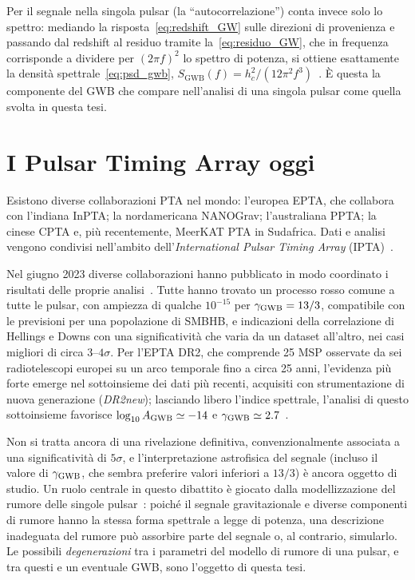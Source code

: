 Per il segnale nella singola pulsar (la ``autocorrelazione'') conta invece solo lo spettro: mediando la risposta~\eqref{eq:redshift_GW} sulle direzioni di provenienza e passando dal redshift al residuo tramite la~\eqref{eq:residuo_GW}, che in frequenza corrisponde a dividere per $(2\pi f)^2$ lo spettro di potenza, si ottiene esattamente la densità spettrale~\eqref{eq:psd_gwb}, $S_{\mathrm{GWB}}(f) = h_c^2/(12\pi^2 f^3)$~\cite{Taylor2021}. È questa la componente del GWB che compare nell'analisi di una singola pulsar come quella svolta in questa tesi.

\section{I Pulsar Timing Array oggi} \label{sec:PTA_oggi}

Esistono diverse collaborazioni PTA nel mondo: l'europea EPTA, che collabora con l'indiana InPTA; la nordamericana NANOGrav; l'australiana PPTA; la cinese CPTA e, più recentemente, MeerKAT PTA in Sudafrica. Dati e analisi vengono condivisi nell'ambito dell'\textit{International Pulsar Timing Array} (IPTA)~\cite{Shaifullah2025}.

Nel giugno 2023 diverse collaborazioni hanno pubblicato in modo coordinato i risultati delle proprie analisi~\cite{EPTA2023_GWB, NANOGrav2023, PPTA2023, CPTA2023}. Tutte hanno trovato un processo rosso comune a tutte le pulsar, con ampiezza di qualche $10^{-15}$ per $\gamma_{\mathrm{GWB}} = 13/3$, compatibile con le previsioni per una popolazione di SMBHB, e indicazioni della correlazione di Hellings e Downs con una significatività che varia da un dataset all'altro, nei casi migliori di circa $3$--$4\sigma$. %
Per l'EPTA DR2, che comprende 25 MSP osservate da sei radiotelescopi europei su un arco temporale fino a circa 25 anni, l'evidenza più forte emerge nel sottoinsieme dei dati più recenti, acquisiti con strumentazione di nuova generazione (\textit{DR2new}); lasciando libero l'indice spettrale, l'analisi di questo sottoinsieme favorisce $\log_{10}A_{\mathrm{GWB}} \simeq -14$ e $\gamma_{\mathrm{GWB}} \simeq 2.7$~\cite{EPTA2023_GWB}. %

Non si tratta ancora di una rivelazione definitiva, convenzionalmente associata a una significatività di $5\sigma$, e l'interpretazione astrofisica del segnale (incluso il valore di $\gamma_{\mathrm{GWB}}$, che sembra preferire valori inferiori a $13/3$) è ancora oggetto di studio. Un ruolo centrale in questo dibattito è giocato dalla modellizzazione del rumore delle singole pulsar~\cite{EPTA2023_noise, Ferranti2025}: poiché il segnale gravitazionale e diverse componenti di rumore hanno la stessa forma spettrale a legge di potenza, una descrizione inadeguata del rumore può assorbire parte del segnale o, al contrario, simularlo. Le possibili \textit{degenerazioni} tra i parametri del modello di rumore di una pulsar, e tra questi e un eventuale GWB, sono l'oggetto di questa tesi.
